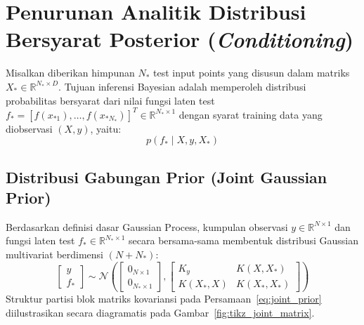 \documentclass[11pt,a4paper]{article}
\def\mathbf#1{#1}%
\begin{document}
\section{Penurunan Analitik Distribusi Bersyarat Posterior (\textit{Conditioning})}
\label{sec:posterior_derivation}

Misalkan diberikan himpunan $N_*$ test input points yang disusun dalam matriks $X_* \in \mathbb{R}^{N_* \times D}$. Tujuan inferensi Bayesian adalah memperoleh distribusi probabilitas bersyarat dari nilai fungsi laten test $\mathbf{f}_* = [f(\mathbf{x}_{*1}), \dots, f(\mathbf{x}_{*N_*})]^T \in \mathbb{R}^{N_* \times 1}$ dengan syarat training data yang diobservasi $(X, \mathbf{y})$, yaitu:
\begin{equation}
p(\mathbf{f}_* \mid X, \mathbf{y}, X_*)
\end{equation}

\subsection{Distribusi Gabungan Prior (Joint Gaussian Prior)}
Berdasarkan definisi dasar Gaussian Process, kumpulan observasi $\mathbf{y} \in \mathbb{R}^{N \times 1}$ dan fungsi laten test $\mathbf{f}_* \in \mathbb{R}^{N_* \times 1}$ secara bersama-sama membentuk distribusi Gaussian multivariat berdimensi $(N + N_*)$:
\begin{equation}
\label{eq:joint_prior}
\begin{bmatrix} \mathbf{y} \\ \mathbf{f}_* \end{bmatrix} \sim \mathcal{N}\left(
\begin{bmatrix} \mathbf{0}_{N \times 1} \\ \mathbf{0}_{N_* \times 1} \end{bmatrix},
\begin{bmatrix}
K_y & K(X, X_*) \\
K(X_*, X) & K(X_*, X_*)
\end{bmatrix}
\right)
\end{equation}
Struktur partisi blok matriks kovariansi pada Persamaan~\eqref{eq:joint_prior} diilustrasikan secara diagramatis pada Gambar~\ref{fig:tikz_joint_matrix}.
\end{document}
